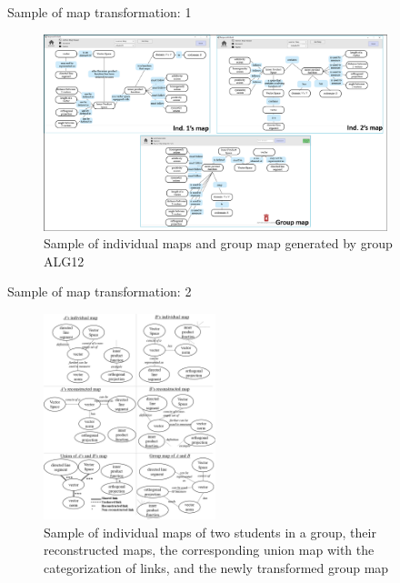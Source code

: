 \begin{frame}{Sample of map transformation: 1}
    \begin{figure}[tb]
    \begin{center}
        \includegraphics[width=100mm]{images/a1_dist_correctness.pdf}
    \end{center}
    \caption{Sample of individual maps and group map generated by group ALG12}
    \label{a1::map_sample}
\end{figure}
\end{frame}

\begin{frame}{Sample of map transformation: 2}
    \begin{figure}[tb]
        \begin{center}
            \includegraphics[width=50mm]{images/a3_sample_of_map.pdf}
        \end{center}
        \caption{Sample of individual maps of two students in a group, their reconstructed maps,
            the corresponding union map with the categorization of links, and the 
            newly transformed group map}
        \label{map_sample}
    \end{figure} 
\end{frame}